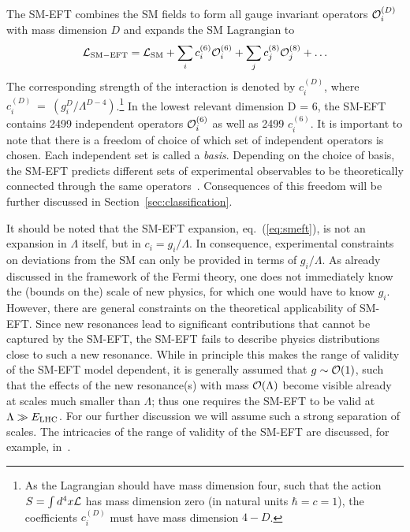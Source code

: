 The SM-EFT combines the SM fields to form all gauge invariant operators
${\cal O}_i^{(D)}$ with mass dimension $D$ and expands the SM
Lagrangian to
\begin{equation}
{\cal L}_{\rm SM-EFT} = {\cal L}_{\rm SM} + \sum_i c_i^{(6)} {\cal O}_i^{(6)} + \sum_j c_j^{(8)} {\cal O}_j^{(8)} + \ldots
\label{eq:smeft}
\end{equation}
The corresponding strength of the interaction is denoted by
$c_i^{(D)}$, where $c_i^{(D)} \ = \ (g_i^D/\Lambda^{D-4})$.\footnote{
  As the Lagrangian should have mass dimension four, such that the
  action $S = \int d^4x {\cal L}$ has mass dimension zero (in natural
  units $\hbar =c =1$), the coefficients $c_i^{(D)}$ must have mass
  dimension $4-D$.}  In the lowest relevant dimension D = 6, the
SM-EFT contains 2499 independent operators ${\cal O}_i^{(6)}$ as well
as 2499 $c_i^{(6)}$. It is important to note that there is a freedom
of choice of which set of independent operators 
is chosen. Each independent set is called a \emph{basis}. Depending on
the choice of basis, the SM-EFT predicts different sets of 
experimental observables to be theoretically connected through the same
operators~\citep[see, e.g.,][]{Falkowski:2015wza}. Consequences of
this freedom will be further discussed in
Section~\ref{sec:classification}. 

It should be noted
that the SM-EFT expansion, eq.~(\ref{eq:smeft}), is not an expansion in $\Lambda$
itself, but in $c_i=g_i/\Lambda$. 
In consequence, experimental constraints on deviations from the SM can
only be provided in terms of $g_i/\Lambda$.
As already discussed in the framework of the Fermi theory, one
does not immediately know the (bounds on the) scale of new physics, 
for which one would have to know $g_i$.
However, there are general constraints on the theoretical applicability of SM-EFT.
Since new resonances lead to significant contributions that cannot be captured by
the SM-EFT, the SM-EFT fails to describe physics distributions close to such a new resonance.
While in principle this makes the range of validity of the SM-EFT model dependent, 
it is generally assumed that $g \sim {\cal{O}}(1)$, such that the effects of the new 
resonance(s) with mass ${\cal{O}}(\Lambda)$ become visible already at
scales much smaller than $\Lambda$; thus one requires the SM-EFT to be valid at 
$\Lambda\gg E_{\rm LHC}$. 
For our further discussion we will assume such a strong separation of scales.
The intricacies of the range of validity of the SM-EFT are discussed,
for example, in~\cite{Contino:2016jqw}.




